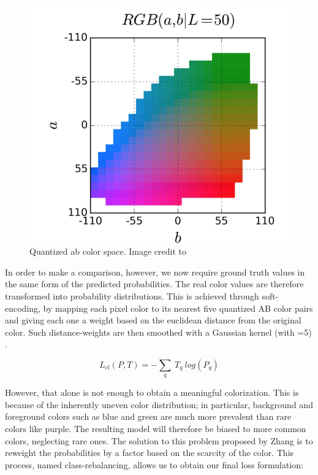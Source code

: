 \documentclass[twoside,twocolumn]{article}
\begin{document}
\begin{figure} [h]
	\includegraphics[width=\linewidth]{img/quantized.png}
	\caption{Quantized ab color space. Image credit to \cite{Zhang:2016}}
	\label{fig:quantized}
\end{figure}


In order to make a comparison, however, we now require ground truth values in the same form of the predicted probabilities. The real color values are therefore transformed into probability distributions. This is achieved through soft-encoding, by mapping each pixel color to its nearest five quantized AB color pairs and giving each one a weight based on the euclidean distance from the original color. Such distance-weights are then smoothed with a Gaussian kernel (with =5) \cite{Geoffrey:2015}.

\begin{equation}
L_{cl}(P,T) = - \sum_{q} \: T_q \: log(P_q)
\end{equation}

However, that alone is not enough to obtain a meaningful colorization. This is because of the inherently uneven color distribution; in particular, background and foreground colors such as blue and green are much more prevalent than rare colors like purple. The resulting model will therefore be biased to more common colors, neglecting rare ones. 
The solution to this problem proposed by Zhang \cite{Zhang:2016} is to reweight the probabilities by a factor based on the scarcity of the color. This process, named class-rebalancing, allows us to obtain our final loss formulation:
\end{document}
